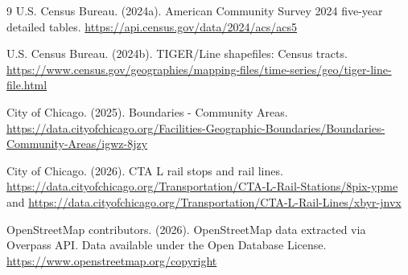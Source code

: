 \documentclass[11pt]{article}
\begin{document}
\begin{thebibliography}{9}
U.S. Census Bureau. (2024a).
\newblock American Community Survey 2024 five-year detailed tables.
\newblock \url{https://api.census.gov/data/2024/acs/acs5}

U.S. Census Bureau. (2024b).
 TIGER/Line shapefiles: Census tracts.
\newblock \url{https://www.census.gov/geographies/mapping-files/time-series/geo/tiger-line-file.html}

City of Chicago. (2025).
\newblock Boundaries - Community Areas.
\newblock \url{https://data.cityofchicago.org/Facilities-Geographic-Boundaries/Boundaries-Community-Areas/igwz-8jzy}

City of Chicago. (2026).
\newblock CTA L rail stops and rail lines.
\newblock \url{https://data.cityofchicago.org/Transportation/CTA-L-Rail-Stations/8pix-ypme} and \url{https://data.cityofchicago.org/Transportation/CTA-L-Rail-Lines/xbyr-jnvx}

OpenStreetMap contributors. (2026).
\newblock OpenStreetMap data extracted via Overpass API. Data available under the Open Database License.
\newblock \url{https://www.openstreetmap.org/copyright}

\end{thebibliography}
\end{document}
